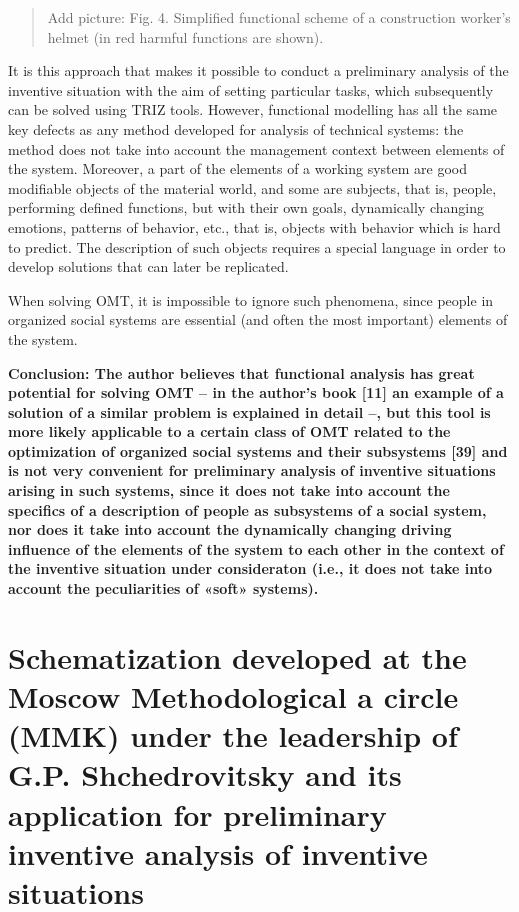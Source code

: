 \documentclass[11pt,a4paper]{book}
\newcommand{\addpicture}[1]{
  \begin{quote} Add picture: #1\end{quote}
}
\begin{document}
\addpicture{Fig. 4. Simplified functional scheme of a construction worker's
  helmet (in red harmful functions are shown).}

It is this approach that makes it possible to conduct a preliminary analysis
of the inventive situation with the aim of setting particular tasks, which
subsequently can be solved using TRIZ tools. However, functional modelling has
all the same key defects as any method developed for analysis of technical
systems: the method does not take into account the management context between
elements of the system. Moreover, a part of the elements of a working system
are good modifiable objects of the material world, and some are subjects, that
is, people, performing defined functions, but with their own goals,
dynamically changing emotions, patterns of behavior, etc., that is, objects
with behavior which is hard to predict.  The description of such objects
requires a special language in order to develop solutions that can later be
replicated.

When solving OMT, it is impossible to ignore such phenomena, since people in
organized social systems are essential (and often the most important) elements
of the system.

\textbf{Conclusion: The author believes that functional analysis has great
  potential for solving OMT -- in the author’s book [11] an example of a
  solution of a similar problem is explained in detail --, but this tool is
  more likely applicable to a certain class of OMT related to the optimization
  of organized social systems and their subsystems [39] and is not very
  convenient for preliminary analysis of inventive situations arising in such
  systems, since it does not take into account the specifics of a description
  of people as subsystems of a social system, nor does it take into account
  the dynamically changing driving influence of the elements of the system to
  each other in the context of the inventive situation under consideraton
  (i.e., it does not take into account the peculiarities of «soft» systems).}

\section[Schematization at MMK]{Schematization developed at the Moscow
  Methodological a circle (MMK) under the leadership of G.P. Shchedrovitsky
  and its application for preliminary inventive analysis of inventive
  situations}
\end{document}
